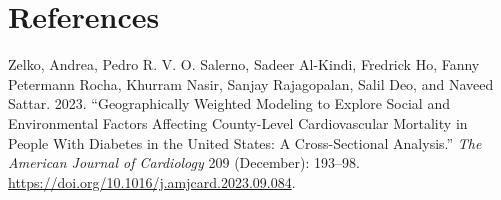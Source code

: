 \documentclass[
]{article}
\newlength{\cslhangindent}
\newenvironment{CSLReferences}[2] %
 {\begin{list}{}{%
  \setlength{\itemindent}{0pt}
  \setlength{\leftmargin}{0pt}
  \setlength{\parsep}{0pt}
  \ifodd #1
   \setlength{\leftmargin}{\cslhangindent}
   \setlength{\itemindent}{-1\cslhangindent}
  \fi
  \setlength{\itemsep}{#2\baselineskip}}}
 {\end{list}}
\begin{document}
\newpage{}

\section*{References}\label{references}

\label{refs}
\begin{CSLReferences}{1}{0}
Zelko, Andrea, Pedro R. V. O. Salerno, Sadeer Al-Kindi, Fredrick Ho,
Fanny Petermann Rocha, Khurram Nasir, Sanjay Rajagopalan, Salil Deo, and
Naveed Sattar. 2023. {``Geographically {Weighted} {Modeling} to
{Explore} {Social} and {Environmental} {Factors} {Affecting}
{County}-{Level} {Cardiovascular} {Mortality} in {People} {With}
{Diabetes} in the {United} {States}: {A} {Cross}-{Sectional}
{Analysis}.''} \emph{The American Journal of Cardiology} 209 (December):
193--98. \url{https://doi.org/10.1016/j.amjcard.2023.09.084}.

\end{CSLReferences}
\end{document}
